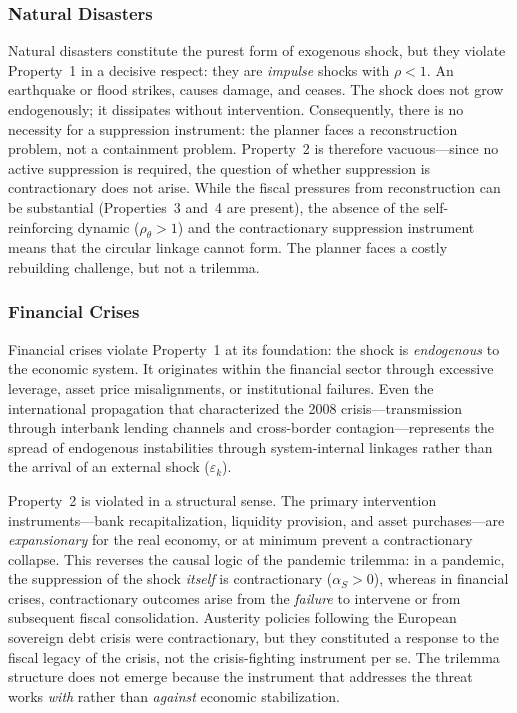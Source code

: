 \documentclass[12pt, a4paper]{article}
\begin{document}
\subsubsection*{Natural Disasters}

Natural disasters constitute the purest form of exogenous shock, but they violate Property~1 in a decisive respect: they are \textit{impulse} shocks with $\rho < 1$. An earthquake or flood strikes, causes damage, and ceases. The shock does not grow endogenously; it dissipates without intervention. Consequently, there is no necessity for a suppression instrument: the planner faces a reconstruction problem, not a containment problem. Property~2 is therefore vacuous---since no active suppression is required, the question of whether suppression is contractionary does not arise. While the fiscal pressures from reconstruction can be substantial (Properties~3 and~4 are present), the absence of the self-reinforcing dynamic ($\rho_\theta > 1$) and the contractionary suppression instrument means that the circular linkage cannot form. The planner faces a costly rebuilding challenge, but not a trilemma.

\subsubsection*{Financial Crises}

Financial crises violate Property~1 at its foundation: the shock is \textit{endogenous} to the economic system. It originates within the financial sector through excessive leverage, asset price misalignments, or institutional failures. Even the international propagation that characterized the 2008 crisis---transmission through interbank lending channels and cross-border contagion---represents the spread of endogenous instabilities through system-internal linkages rather than the arrival of an external shock ($\varepsilon_k$).

Property~2 is violated in a structural sense. The primary intervention instruments---bank recapitalization, liquidity provision, and asset purchases---are \textit{expansionary} for the real economy, or at minimum prevent a contractionary collapse. This reverses the causal logic of the pandemic trilemma: in a pandemic, the suppression of the shock \textit{itself} is contractionary ($\alpha_S > 0$), whereas in financial crises, contractionary outcomes arise from the \textit{failure} to intervene or from subsequent fiscal consolidation. Austerity policies following the European sovereign debt crisis were contractionary, but they constituted a response to the fiscal legacy of the crisis, not the crisis-fighting instrument per se. The trilemma structure does not emerge because the instrument that addresses the threat works \textit{with} rather than \textit{against} economic stabilization.
\end{document}
